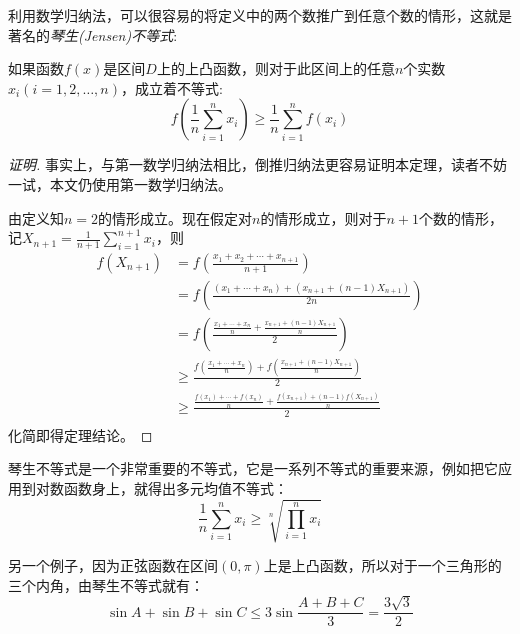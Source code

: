 利用数学归纳法，可以很容易的将定义中的两个数推广到任意个数的情形，这就是著名的\emph{琴生(Jensen)不等式}:
\begin{theorem}
  \label{theorem:convexity-function-multile}
如果函数$f(x)$是区间$D$上的上凸函数，则对于此区间上的任意$n$个实数$x_i(i=1,2,\ldots,n)$，成立着不等式:
\begin{equation}
  \label{eq:convexity-function-multile}
  f(\frac{1}{n}\sum_{i=1}^nx_i) \geqslant \frac{1}{n}\sum_{i=1}^nf(x_i)
\end{equation}
\end{theorem}

\begin{proof}[证明]
  事实上，与第一数学归纳法相比，倒推归纳法更容易证明本定理，读者不妨一试，本文仍使用第一数学归纳法。

  由定义知$n=2$的情形成立。现在假定对$n$的情形成立，则对于$n+1$个数的情形，记$X_{n+1}=\frac{1}{n+1}\sum_{i=1}^{n+1}x_i$，则
\begin{equation}
  \begin{split}
f(X_{n+1}) & = f \left( \frac{x_1+x_2+\cdots+x_{n+1}}{n+1} \right) \\
& = f \left( \frac{(x_1+\cdots+x_n)+(x_{n+1}+(n-1)X_{n+1})}{2n} \right) \\
& = f \left( \frac{\frac{x_1+\cdots+x_n}{n} + \frac{x_{n+1}+(n-1)X_{n+1}}{n}}{2} \right) \\
& \geqslant \frac{f \left( \frac{x_1+\cdots+x_n}{n} \right) + f \left( \frac{x_{n+1}+(n-1)X_{n+1}}{n} \right)}{2} \\
& \geqslant \frac{\frac{f(x_1)+\cdots+f(x_n)}{n} + \frac{f(x_{n+1})+(n-1)f(X_{n+1})}{n}}{2} \\
  \end{split}
\end{equation}
化简即得定理结论。
\end{proof}

琴生不等式是一个非常重要的不等式，它是一系列不等式的重要来源，例如把它应用到对数函数身上，就得出多元均值不等式：
\begin{equation*}
\frac{1}{n}\sum_{i=1}^nx_i \geqslant \sqrt[n]{\prod_{i=1}^nx_i}
\end{equation*}

另一个例子，因为正弦函数在区间$(0,\pi)$上是上凸函数，所以对于一个三角形的三个内角，由琴生不等式就有：
\begin{equation*}
\sin{A}+\sin{B}+\sin{C} \leqslant 3\sin{\frac{A+B+C}{3}} = \frac{3\sqrt{3}}{2}
\end{equation*}

